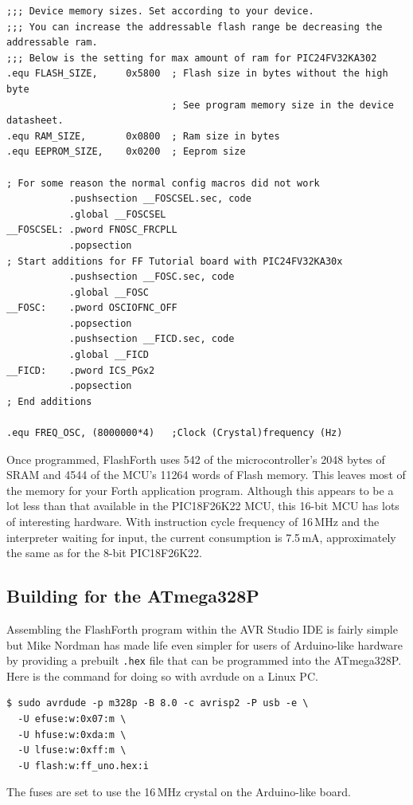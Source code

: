 \documentclass[12pt,a4paper]{article}
\begin{document}
\noindent
{\scriptsize
\begin{verbatim}
;;; Device memory sizes. Set according to your device.
;;; You can increase the addressable flash range be decreasing the addressable ram.
;;; Below is the setting for max amount of ram for PIC24FV32KA302
.equ FLASH_SIZE,     0x5800  ; Flash size in bytes without the high byte
                             ; See program memory size in the device datasheet.
.equ RAM_SIZE,       0x0800  ; Ram size in bytes
.equ EEPROM_SIZE,    0x0200  ; Eeprom size

; For some reason the normal config macros did not work
           .pushsection __FOSCSEL.sec, code
           .global __FOSCSEL
__FOSCSEL: .pword FNOSC_FRCPLL
           .popsection
; Start additions for FF Tutorial board with PIC24FV32KA30x
           .pushsection __FOSC.sec, code
           .global __FOSC
__FOSC:    .pword OSCIOFNC_OFF
           .popsection
           .pushsection __FICD.sec, code
           .global __FICD
__FICD:    .pword ICS_PGx2
           .popsection
; End additions	   

.equ FREQ_OSC, (8000000*4)	 ;Clock (Crystal)frequency (Hz)
\end{verbatim}
} %

\medskip\noindent
Once programmed, FlashForth uses 542 of the microcontroller's 2048 bytes of SRAM and
4544 of the MCU's 11264 words of Flash memory.
This leaves most of the memory for your Forth application program.
Although this appears to be a lot less than that available in the PIC18F26K22 MCU,
this 16-bit MCU has lots of interesting hardware.
With instruction cycle frequency of 16\,MHz and the interpreter waiting for input,
the current consumption is 7.5\,mA, approximately the same as for the 8-bit PIC18F26K22. 


\medskip
\subsection{Building for the ATmega328P}
%
Assembling the FlashForth program within the AVR Studio IDE is fairly simple but
Mike Nordman has made life even simpler for users of Arduino-like hardware by providing
a prebuilt \verb!.hex! file that can be programmed into the ATmega328P.
Here is the command for doing so with avrdude on a Linux PC.
\begin{verbatim}
$ sudo avrdude -p m328p -B 8.0 -c avrisp2 -P usb -e \
  -U efuse:w:0x07:m \
  -U hfuse:w:0xda:m \
  -U lfuse:w:0xff:m \
  -U flash:w:ff_uno.hex:i
\end{verbatim}
The fuses are set to use the 16\,MHz crystal on the Arduino-like board.
\end{document}
